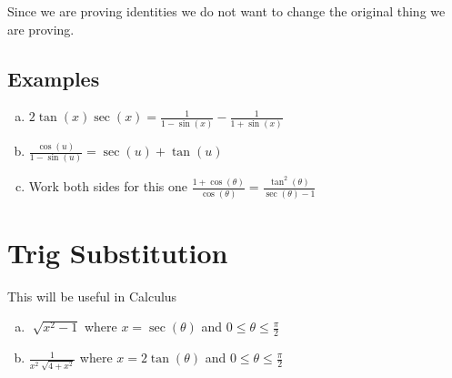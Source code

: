 \documentclass{tufte-handout}
\begin{document}
Since we are proving identities we do not want to change the original thing we are proving.

\subsection{Examples}
\begin{enumerate}[(a)]
\item $2\tan(x)\sec(x) = \frac{1}{1-\sin(x)}- \frac{1}{1+\sin(x)}$
\item $\frac{\cos(u)}{1-\sin(u)} = \sec(u) + \tan(u)$
\item Work both sides for this one $\frac{1 + \cos(\theta)}{\cos(\theta)} = \frac{\tan^2(\theta)}{\sec(\theta)-1}$
\end{enumerate}

\section{Trig Substitution}
This will be useful in Calculus

\begin{enumerate}[(a)]
\item $\sqrt[]{x^2 -1}$ where $x = \sec(\theta)$ and $0 \leq \theta \leq \frac{\pi}{2}$
\item $\frac{1}{x^2\sqrt[]{4+x^2}}$ where $x = 2\tan(\theta)$ and $0 \leq \theta \leq \frac{\pi}{2}$
\end{enumerate}
\end{document}
